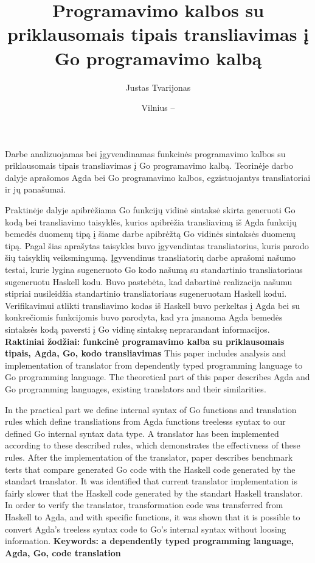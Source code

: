 \documentclass{VUMIFPSkursinis}
\title{Programavimo kalbos su priklausomais tipais transliavimas į Go programavimo kalbą}
\author{Justas Tvarijonas}
\date{Vilnius – \the\year}
\begin{document}
\maketitle

Darbe analizuojamas bei įgyvendinamas funkcinės programavimo kalbos su priklausomais tipais transliavimas į Go programavimo kalbą. Teorinėje darbo dalyje aprašomos Agda bei Go programavimo kalbos, egzistuojantys transliatoriai ir jų panašumai. 
\par Praktinėje dalyje apibrėžiama Go funkcijų vidinė sintaksė skirta generuoti Go kodą bei transliavimo taisyklės, kurios apibrėžia transliavimą iš Agda funkcijų bemedės duomenų tipą į šiame darbe apibrėžtą Go vidinės sintaksės duomenų tipą. Pagal šias aprašytas taisykles buvo įgyvendintas transliatorius, kuris parodo šių taisyklių veiksmingumą. Įgyvendinus transliatorių darbe aprašomi našumo testai, kurie lygina sugeneruoto Go kodo našumą su standartinio transliatoriaus sugeneruotu Haskell kodu. Buvo pastebėta, kad dabartinė realizacija našumu stipriai nusileidžia standartinio transliatoriaus sugeneruotam Haskell kodui. Verifikavimui atlikti transliavimo kodas iš Haskell buvo perkeltas į Agda bei su konkrečiomis funkcijomis buvo parodyta, kad yra įmanoma Agda bemedės sintaksės kodą paversti į Go vidinę sintaksę neprarandant informacijos.
\newline
\textbf{Raktiniai žodžiai: funkcinė programavimo kalba su priklausomais tipais, Agda, Go, kodo transliavimas}
This paper includes analysis and implementation of translator from dependently typed programming language to Go programming language. The theoretical part of this paper describes Agda and Go programming languages, existing translators and their similarities. 
\par In the practical part we define internal syntax of Go functions and translation rules which define transliations from Agda functions treelesss syntax to our defined Go internal syntax data type. A translator has been implemented according to these described rules, which demonstrates the effectivness of these rules. After the implementation of the translator, paper describes benchmark tests that compare generated Go code with the Haskell code generated by the standart translator. It was identified that current translator implementation is fairly slower that the Haskell code generated by the standart Haskell translator. In order to verify the translator, transformation code was transferred from Haskell to Agda, and with specific functions, it was shown that it is possible to convert Agda's treeless syntax code to Go's internal syntax without loosing information.
\newline
\textbf{Keywords: a dependently typed programming language, Agda, Go, code translation}
\end{document}
